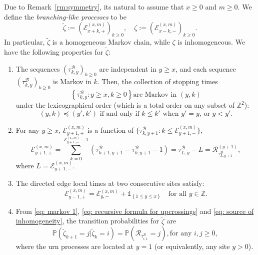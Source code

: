 \documentclass[EJP]{ejpecp} %
\begin{document}
Due to Remark~\ref{rm:symmetry}, its natural to assume that $x\ge 0$ and $m \ge 0$. We define the \textit{branching-like processes} to be
\[
\tilde{\zeta} := \left(\mathcal{E}^{(x,m)}_{x+k,+} \right)_{k\geq 0}, \quad
\zeta := \left(\mathcal{E}^{(x,m)}_{x-k,-} \right)_{k\geq 0}
.\]
In particular, $\tilde{\zeta}$ is a homogeneous Markov chain, while $\zeta$ is inhomogeneous. We have the following properties for $\tilde{\zeta}$:
\begin{enumerate}
	\item The sequences $(\tau^{\mathscr{B}}_{k,y})_{k\geq 0} $ are independent in $y \geq x$, and each sequence $\left(\tau^{\mathscr{B}}_{k,y}\right)_{k\geq 0} $ is Markov in $k$. Then, the collection of stopping times
	\begin{equation}\label{eq: markov 1} 
		\left\{\tau^{\mathscr{B}}_{k,y}: y\geq x, k\geq 0 \right\} \mbox{are Markov in $(y,k)$}
	\end{equation}
	under the lexicographical order (which is a total order on any subset of $\mathbb{Z}^2$): 
	\begin{equation*}\label{eq: lexicographical order}
		(y,k) \preceq (y',k')  \mbox{ if and only if }
		k \leq k'   \mbox{ when $y' = y$, or } 
		y <y'. 
	\end{equation*} 
	
	\item  For any $y\geq x$, 
	$\mathcal{E}^{(x,m)}_{y+1,+}$ is a function of $\{\tau^{\mathscr{B}}_{k,y+1}: k\leq \mathcal{E}^{(x,m)}_{y+1,-}\}$,
	\begin{equation} \label{eq: recursive formula for upcrossings}
		\mathcal{E}_{y+1,+}^{(x,m)}	=  \sum_{k= 0 }^{\mathcal{E}_{y+1,-}^{(x,m)}-1}	\left(\tau^{\mathscr{B}}_{k+1,y+1}-\tau^{\mathscr{B}}_{k,y+1}-1 \right) = \tau^{\mathscr{B}}_{ L,y } - L = \mathscr{R}^{(y + 1)}_{\tau^{\mathscr{B}}_{ L,y+1 }},
	\end{equation}
	where $L = \mathcal{E}_{y+1,-}^{(x,m)}$.
	
	\item The directed edge local times at two consecutive sites satisfy:
	\begin{equation}\label{eq: source of inhomogeneity}
		\mathcal{E}_{y-1,+}^{(x,m)} = \mathcal{E}_{y,-}^{(x,m)} + \mathbb{1}_{ \left\{ 1\leq y \leq x \right\} }
		\quad \text{for all }y\in \mathbb{Z}.
	\end{equation}
	
	\item  From \eqref{eq: markov 1}, \eqref{eq: recursive formula for upcrossings} and \eqref{eq: source of inhomogeneity}, the transition probabilities for $\tilde{\zeta}$ are 
	\begin{equation}\label{eq: transition prob on positive}
		\mathbb{P}\left(\tilde{\zeta}_{k+1}=j \vert \tilde{\zeta}_k =i  \right) = 
		\mathbb{P}\left( \mathscr{R}_{\tau_{i,1}^{\mathscr{B}}} = j \right), \mbox{for any $i,j\geq 0$, } 
	\end{equation} 
	where the urn processes are located at $y = 1$ (or equivalently, any site $y>0$).
\end{enumerate}
\end{document}
